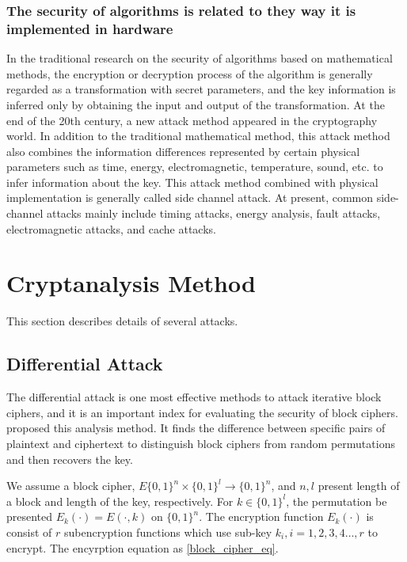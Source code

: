 \subsubsection{The security of algorithms is related to they way it is implemented in hardware}
In the traditional research on the security of algorithms based on mathematical methods, the encryption or decryption process of the algorithm is generally regarded as a transformation with secret parameters, and the key information is inferred only by obtaining the input and output of the transformation. At the end of the 20th century, a new attack method appeared in the cryptography world. In addition to the traditional mathematical method, this attack method also combines the information differences represented by certain physical parameters such as time, energy, electromagnetic, temperature, sound, etc. to infer information about the key. This attack method combined with physical implementation is generally called side channel attack. At present, common side-channel attacks mainly include timing attacks, energy analysis, fault attacks, electromagnetic attacks, and cache attacks.

\section{Cryptanalysis Method}\label{cry_method}
This section describes details of several attacks.

\subsection{Differential Attack}
The differential attack is one most effective methods to attack iterative block ciphers,  and it is an important index for evaluating the security of block ciphers. \cite{biham1991differential} proposed this analysis method. It finds the difference between specific pairs of plaintext and ciphertext to distinguish block ciphers from random permutations and then recovers the key. 

We assume a block cipher, $E\{0,1\}^n \times \{0,1\}^l \to \{0,1\}^n$, and $n, l$ present length of a block and length of the key, respectively. For $k \in \{0,1\}^l$, the permutation be presented $E_k(\cdot)=E(\cdot, k)$ on $\{0,1\}^n$. The encryption function $E_k(\cdot)$ is consist of $r$ sub\-encryption functions which use sub-key $k_i, i=1,2,3,4…,r$ to encrypt. The encyrption equation as \ref{block_cipher_eq}.

